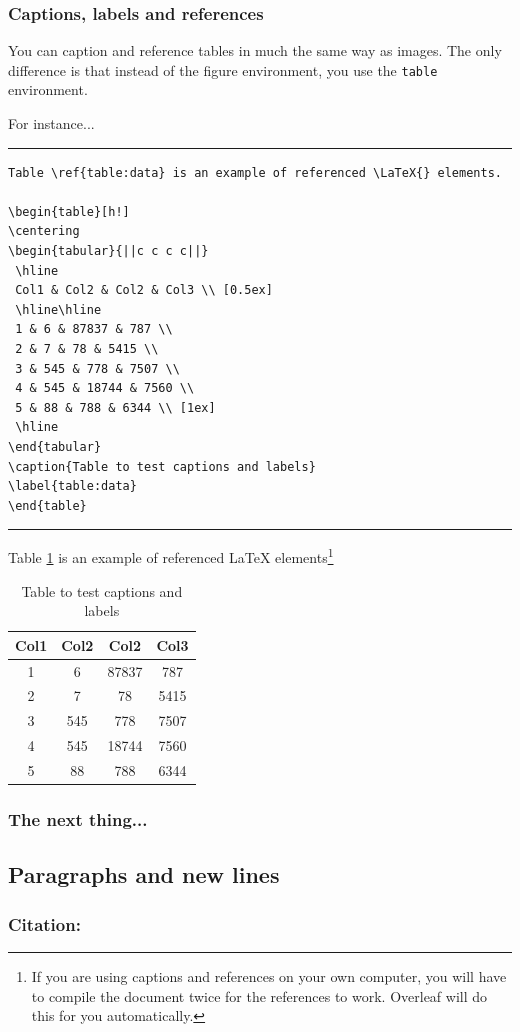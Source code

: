 \documentclass[12pt]{article}
\begin{document}
\subsubsection{Captions, labels and references}

You can caption and reference tables in much the same way as images. The only difference is that instead of the figure environment, you use the \texttt{table} environment. 

\begin{minipage}{\linewidth}
For instance...\bigskip
\hrule
\begin{lstlisting}
Table \ref{table:data} is an example of referenced \LaTeX{} elements.

\begin{table}[h!]
\centering
\begin{tabular}{||c c c c||} 
 \hline
 Col1 & Col2 & Col2 & Col3 \\ [0.5ex] 
 \hline\hline
 1 & 6 & 87837 & 787 \\ 
 2 & 7 & 78 & 5415 \\
 3 & 545 & 778 & 7507 \\
 4 & 545 & 18744 & 7560 \\
 5 & 88 & 788 & 6344 \\ [1ex] 
 \hline
\end{tabular}
\caption{Table to test captions and labels}
\label{table:data}
\end{table}
\end{lstlisting}
\hrule
\end{minipage}\bigskip

Table \ref{table:data} is an example of referenced \LaTeX{} elements\footnote{If you are using captions and references on your own computer, you will have to compile the document twice for the references to work. Overleaf will do this for you automatically.}

\begin{table}[h!]
	\centering
	\begin{tabular}{||c c c c||} 
		\hline
		Col1 & Col2 & Col2 & Col3 \\ [0.5ex] 
		\hline\hline
		1 & 6 & 87837 & 787 \\ 
		2 & 7 & 78 & 5415 \\
		3 & 545 & 778 & 7507 \\
		4 & 545 & 18744 & 7560 \\
		5 & 88 & 788 & 6344 \\ [1ex] 
		\hline
	\end{tabular}
	\caption{Table to test captions and labels}
	\label{table:data}
\end{table}

\subsubsection{The next thing...}

\newpage

\subsection{Paragraphs and new lines}
\label{subsec:Parag-nwl}


\subsubsection*{Citation:}
\blindtext[1]
\end{document}
